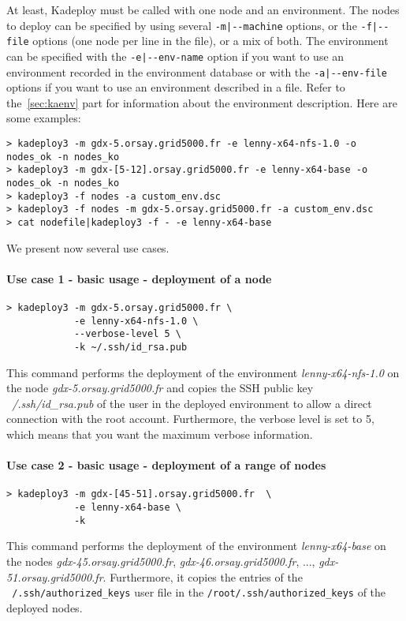 \documentclass[a4wide,10pt,oneside]{book}
\begin{document}
At least, Kadeploy must be called with one node and an environment. The nodes to deploy can be specified by using several \texttt{-m|-{}-machine} options, or the \texttt{-f|-{}-file} options (one node per line in the file), or a mix of both.
The environment can be specified with the \texttt{-e|-{}-env-name} option if you want to use an environment recorded in the environment database or with the \texttt{-a|-{}-env-file} options if you want to use an environment described in a file. Refer to the~\ref{sec:kaenv} part for information about the environment description. Here are some examples:
\begin{verbatim}
> kadeploy3 -m gdx-5.orsay.grid5000.fr -e lenny-x64-nfs-1.0 -o nodes_ok -n nodes_ko
> kadeploy3 -m gdx-[5-12].orsay.grid5000.fr -e lenny-x64-base -o nodes_ok -n nodes_ko
> kadeploy3 -f nodes -a custom_env.dsc
> kadeploy3 -f nodes -m gdx-5.orsay.grid5000.fr -a custom_env.dsc
> cat nodefile|kadeploy3 -f - -e lenny-x64-base
\end{verbatim}

We present now several use cases.

\paragraph{Use case 1 - basic usage - deployment of a node}
\begin{verbatim}
> kadeploy3 -m gdx-5.orsay.grid5000.fr \
            -e lenny-x64-nfs-1.0 \
            --verbose-level 5 \
            -k ~/.ssh/id_rsa.pub
\end{verbatim}
This command performs the deployment of the environment \textit{lenny-x64-nfs-1.0} on the node \textit{gdx-5.orsay.grid5000.fr} and copies the SSH public key \textit{~/.ssh/id\_rsa.pub} of the user in the deployed environment to allow a direct connection with the root account. Furthermore, the verbose level is set to 5, which means that you want the maximum verbose information.


\paragraph{Use case 2 - basic usage - deployment of a range of nodes}
\begin{verbatim}
> kadeploy3 -m gdx-[45-51].orsay.grid5000.fr  \
            -e lenny-x64-base \
            -k
\end{verbatim}
This command performs the deployment of the environment \textit{lenny-x64-base} on the nodes \textit{gdx-45.orsay.grid5000.fr}, \textit{gdx-46.orsay.grid5000.fr}, ..., \textit{gdx-51.orsay.grid5000.fr}. Furthermore, it copies the entries of the \texttt{~/.ssh/authorized\_keys} user file in the \texttt{/root/.ssh/authorized\_keys} of the deployed nodes.
\end{document}
